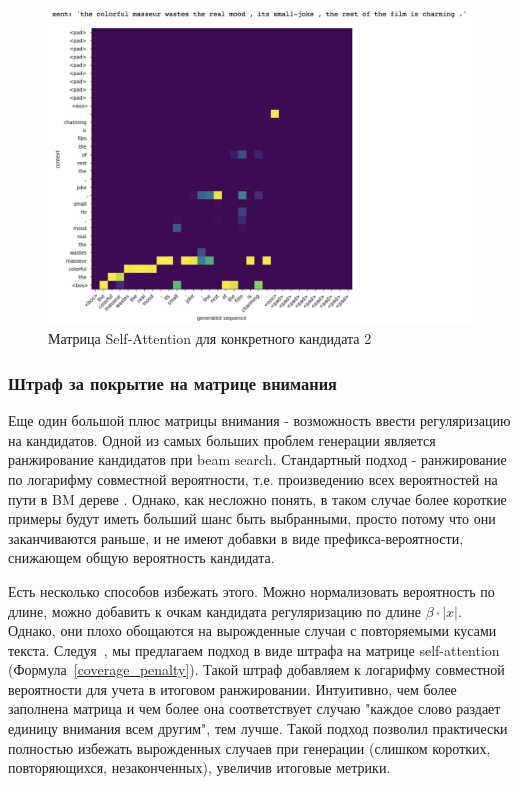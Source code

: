 \documentclass{spbau-diploma}
\begin{document}
\begin{figure}[h]
\centering
\includegraphics[width=\textwidth]{images/sa_sample2.png}
\caption{Матрица Self-Attention для конкретного кандидата 2}
\label{sa_sample2}
\end{figure}

\subsubsection{Штраф за покрытие на матрице внимания}
Еще один большой плюс матрицы внимания - возможность ввести регуляризацию на
кандидатов. Одной из самых больших проблем генерации является ранжирование 
кандидатов при beam search. Стандартный подход - ранжирование по логарифму 
совместной вероятности, т.е. произведению всех вероятностей на пути в BM дереве
. Однако, как несложно понять, в таком случае более короткие примеры будут 
иметь больший шанс быть выбранными, просто потому что они заканчиваются 
раньше, и не имеют добавки в виде префикса-вероятности, снижающем общую 
вероятность кандидата. 

Есть несколько способов избежать этого. Можно нормализовать вероятность по 
длине, можно добавить к очкам кандидата регуляризацию по длине 
$\beta \cdot |x|$. Однако, они плохо обощаются на вырожденные случаи с 
повторяемыми кусами текста. Следуя~\cite{1703.03906}, мы предлагаем подход в 
виде штрафа на матрице self-attention (Формула~\ref{coverage_penalty}). Такой
штраф добавляем к логарифму совместной вероятности для учета в итоговом 
ранжировании. Интуитивно, чем более заполнена матрица и чем более она 
соответствует случаю "каждое слово раздает единицу внимания всем другим", тем
лучше. Такой подход позволил практически полностью избежать вырожденных случаев
при генерации (слишком коротких, повторяющихся, незаконченных), увеличив 
итоговые метрики.
\end{document}

